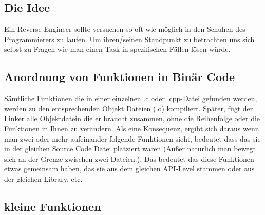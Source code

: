 
\subsection{Die Idee}  

Ein Reverse Engineer sollte versuchen so oft wie m\"oglich in den Schuhen des
Programmierers zu laufen. Um ihren/seinen Standpunkt zu betrachten uns sich
selbst zu Fragen wie man einen Task in spezifischen F\"allen l\"osen w\"urde.

\subsection{Anordnung von Funktionen in Bin\"ar Code}  

S\"amtliche Funktionen die in einer einzelnen .c oder .cpp-Datei gefunden werden,
werden zu den entsprechenden Objekt Dateien (.o) kompiliert. Sp\"ater, f\"ugt
der Linker alle Objektdatein die er braucht zusammen, ohne die Reihenfolge oder
die Funktionen in Ihnen zu ver\"andern. Als eine Konsequenz, ergibt sich daraus
wenn man zwei oder mehr aufeinander folgende Funktionen sieht, bedeutet dass das
sie in der gleichen Source Code Datei platziert waren (Außer nat\"urlich man bewegt
sich an der Grenze zwischen zwei Dateien.). Das bedeutet das diese Funktionen etwas
gemeinsam haben, das sie aus dem gleichen \ac{API}-Level stammen oder aus der
gleichen Library, etc.


\subsection{kleine Funktionen} 

